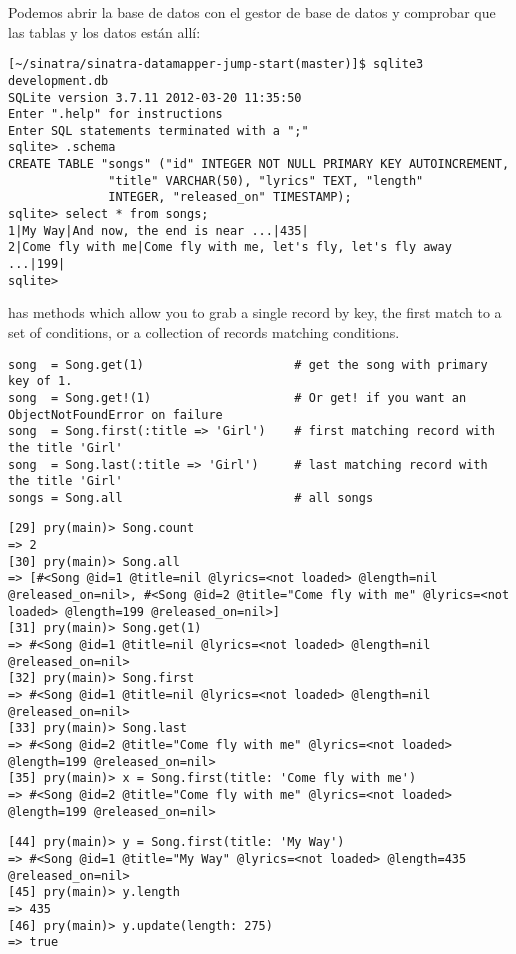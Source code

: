 Podemos abrir la base de datos con el gestor de base de datos y comprobar
que las tablas y los datos están allí:
\begin{verbatim}
[~/sinatra/sinatra-datamapper-jump-start(master)]$ sqlite3 development.db 
SQLite version 3.7.11 2012-03-20 11:35:50
Enter ".help" for instructions
Enter SQL statements terminated with a ";"
sqlite> .schema
CREATE TABLE "songs" ("id" INTEGER NOT NULL PRIMARY KEY AUTOINCREMENT, 
		      "title" VARCHAR(50), "lyrics" TEXT, "length"
		      INTEGER, "released_on" TIMESTAMP);
sqlite> select * from songs;
1|My Way|And now, the end is near ...|435|
2|Come fly with me|Come fly with me, let's fly, let's fly away ...|199|
sqlite> 
\end{verbatim}

\datamapper{} has methods which allow you to grab a single record by
key, the first match to a set of conditions, or a collection of
records matching conditions.

\begin{verbatim}
song  = Song.get(1)                     # get the song with primary key of 1.
song  = Song.get!(1)                    # Or get! if you want an ObjectNotFoundError on failure
song  = Song.first(:title => 'Girl')    # first matching record with the title 'Girl'
song  = Song.last(:title => 'Girl')     # last matching record with the title 'Girl'
songs = Song.all                        # all songs
\end{verbatim}

\begin{verbatim}
[29] pry(main)> Song.count
=> 2
[30] pry(main)> Song.all
=> [#<Song @id=1 @title=nil @lyrics=<not loaded> @length=nil @released_on=nil>, #<Song @id=2 @title="Come fly with me" @lyrics=<not loaded> @length=199 @released_on=nil>]
[31] pry(main)> Song.get(1)
=> #<Song @id=1 @title=nil @lyrics=<not loaded> @length=nil @released_on=nil>
[32] pry(main)> Song.first
=> #<Song @id=1 @title=nil @lyrics=<not loaded> @length=nil @released_on=nil>
[33] pry(main)> Song.last
=> #<Song @id=2 @title="Come fly with me" @lyrics=<not loaded> @length=199 @released_on=nil>
[35] pry(main)> x = Song.first(title: 'Come fly with me')
=> #<Song @id=2 @title="Come fly with me" @lyrics=<not loaded> @length=199 @released_on=nil>
\end{verbatim}

\begin{verbatim}
[44] pry(main)> y = Song.first(title: 'My Way')
=> #<Song @id=1 @title="My Way" @lyrics=<not loaded> @length=435 @released_on=nil>
[45] pry(main)> y.length
=> 435
[46] pry(main)> y.update(length: 275)
=> true
\end{verbatim}

